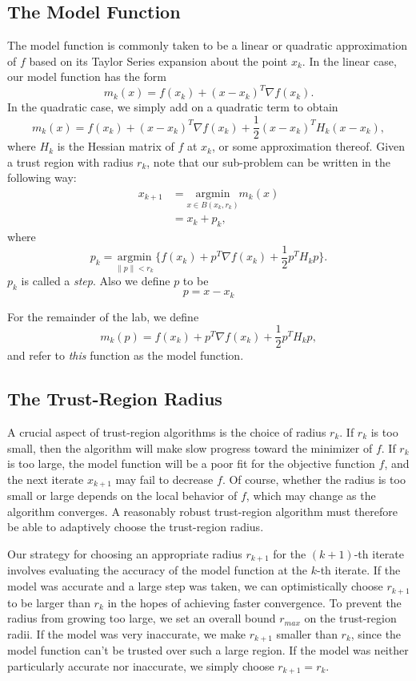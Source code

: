 \subsection*{The Model Function}
The model function is commonly taken to be a linear or quadratic approximation of
$f$ based on its Taylor Series expansion about the point $x_k$. In the linear case,
our model function has the form
\[
m_k(x) = f(x_k) + (x-x_k)^T \nabla f(x_k).
\]
In the quadratic case, we simply add on a quadratic term to obtain
\[
m_k(x) = f(x_k) + (x-x_k)^T \nabla f(x_k) + \frac{1}{2}(x - x_k)^T H_k (x-x_k),
\]
where $H_k$ is the Hessian matrix of $f$ at $x_k$, or some approximation thereof.
Given a trust region with radius $r_k$, note that our sub-problem can be
written in the following way:
\begin{align*}
x_{k+1} &= \underset{x \in B(x_k, r_k)}{\text{argmin}} m_k(x)\\
&= x_k + p_k,
\end{align*}
where
\begin{equation}
p_k = \underset{\|p\| < r_k}{\text{argmin}}\, \{f(x_k) + p^T \nabla f(x_k) + \frac{1}{2}p^T H_k p\}.
\label{eq:step}
\end{equation}
$p_k$ is called a \emph{step}.
Also we define $p$ to be
\begin{equation}
p = x - x_k
\end{equation}

For the remainder of the lab, we define
\[
m_k(p) = f(x_k) + p^T \nabla f(x_k) + \frac{1}{2}p^T H_k p,
\]
and refer to \emph{this} function as the model function.

\subsection*{The Trust-Region Radius}
A crucial aspect of trust-region algorithms is the choice of radius $r_k$. If $r_k$ is too small, then the algorithm will
make slow progress toward the minimizer of $f$. If $r_k$ is too large, the model function will be a poor fit for the objective
function $f$, and the next iterate $x_{k+1}$ may fail to decrease $f$.
Of course, whether the radius is too small or large depends on the local behavior of $f$, which may change as the algorithm
converges. A reasonably robust trust-region algorithm must therefore be able to adaptively choose the trust-region radius.

Our strategy for choosing an appropriate radius $r_{k+1}$ for the $(k+1)$-th iterate involves evaluating the accuracy
of the model function at the $k$-th iterate. If the model was accurate and a large step was taken, we can optimistically choose $r_{k+1}$ to be larger
than $r_k$ in the hopes of achieving faster convergence.
To prevent the radius from growing too large, we set an overall bound $r_{max}$ on the trust-region radii.
If the model was very inaccurate, we make $r_{k+1}$ smaller than
$r_k$, since the model function can't be trusted over such a large region. If the model was neither particularly accurate
nor inaccurate, we simply choose $r_{k+1} = r_k$.

